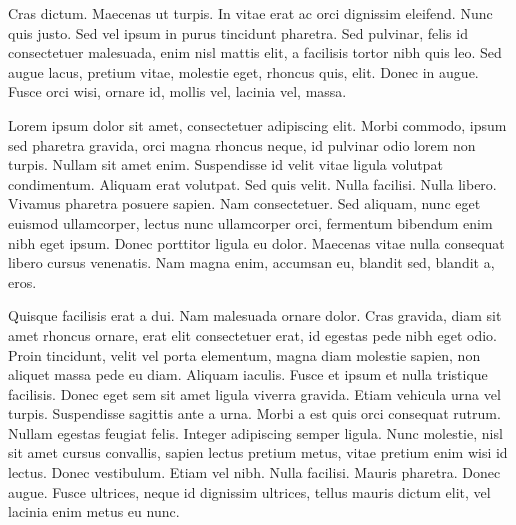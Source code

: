 Cras dictum. Maecenas ut turpis. In vitae erat ac orci dignissim eleifend. Nunc
quis justo. Sed vel ipsum in purus tincidunt pharetra. Sed pulvinar, felis id
consectetuer malesuada, enim nisl mattis elit, a facilisis tortor nibh quis
leo. Sed augue lacus, pretium vitae, molestie eget, rhoncus quis, elit. Donec
in augue. Fusce orci wisi, ornare id, mollis vel, lacinia vel, massa.

Lorem ipsum dolor sit amet, consectetuer adipiscing elit. Morbi commodo, ipsum
sed pharetra gravida, orci magna rhoncus neque, id pulvinar odio lorem non
turpis. Nullam sit amet enim. Suspendisse id velit vitae ligula volutpat
condimentum. Aliquam erat volutpat. Sed quis velit. Nulla facilisi. Nulla
libero. Vivamus pharetra posuere sapien. Nam consectetuer. Sed aliquam, nunc
eget euismod ullamcorper, lectus nunc ullamcorper orci, fermentum bibendum enim
nibh eget ipsum. Donec porttitor ligula eu dolor. Maecenas vitae nulla
consequat libero cursus venenatis. Nam magna enim, accumsan eu, blandit sed,
blandit a, eros.

Quisque facilisis erat a dui. Nam malesuada ornare dolor. Cras gravida, diam
sit amet rhoncus ornare, erat elit consectetuer erat, id egestas pede nibh eget
odio. Proin tincidunt, velit vel porta elementum, magna diam molestie sapien,
non aliquet massa pede eu diam. Aliquam iaculis. Fusce et ipsum et nulla
tristique facilisis. Donec eget sem sit amet ligula viverra gravida. Etiam
vehicula urna vel turpis. Suspendisse sagittis ante a urna. Morbi a est quis
orci consequat rutrum. Nullam egestas feugiat felis. Integer adipiscing semper
ligula. Nunc molestie, nisl sit amet cursus convallis, sapien lectus pretium
metus, vitae pretium enim wisi id lectus. Donec vestibulum. Etiam vel nibh.
Nulla facilisi. Mauris pharetra. Donec augue. Fusce ultrices, neque id
dignissim ultrices, tellus mauris dictum elit, vel lacinia enim metus eu nunc.
